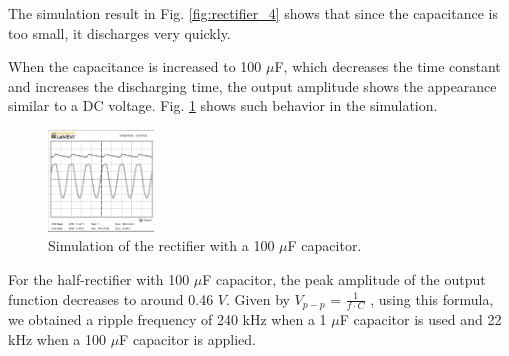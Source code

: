 \documentclass[letterpaper, 10 pt, conference]{ieeeconf}  %
\begin{document}
\par The simulation result in Fig. \ref{fig:rectifier_4} shows that since the
capacitance is too small, it discharges very quickly.
\par When the capacitance is increased to 100 $\mu$F, which decreases the time
constant and increases the discharging time, the output amplitude shows the appearance
similar to a DC voltage. Fig. \ref{fig:rectifier_5} shows such behavior in the simulation.
\begin{figure}[!hb]
  \centering
  \includegraphics[width=0.25\textwidth]{images/halfwave_100miuf.png}
  \caption{Simulation of the rectifier with a 100 $\mu$F capacitor.}
  \label{fig:rectifier_5}
\end{figure}
\par For the half-rectifier with 100 $\mu$F capacitor, the peak amplitude of
the output function decreases to around 0.46 $V$. Given by $V_{p-p}$ = $\frac {1}{f \cdot C}$
, using this formula, we obtained a ripple frequency of 240 kHz when a 1 $\mu$F
capacitor is used and 22 kHz when a 100 $\mu$F capacitor is applied.
\end{document}
